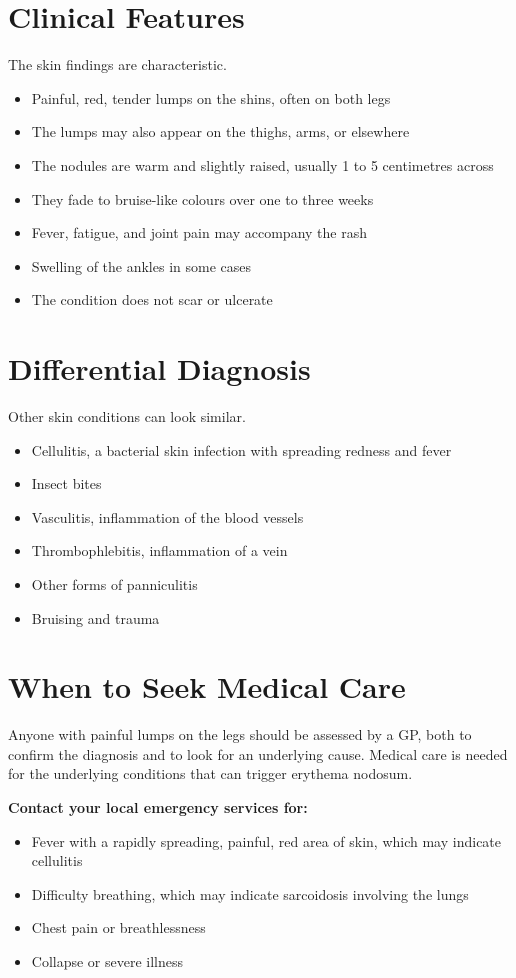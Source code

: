\section*{Clinical Features}
The skin findings are characteristic.
\begin{itemize}
    \item Painful, red, tender lumps on the shins, often on both legs
    \item The lumps may also appear on the thighs, arms, or elsewhere
    \item The nodules are warm and slightly raised, usually 1 to 5 centimetres across
    \item They fade to bruise-like colours over one to three weeks
    \item Fever, fatigue, and joint pain may accompany the rash
    \item Swelling of the ankles in some cases
    \item The condition does not scar or ulcerate
\end{itemize}

\section*{Differential Diagnosis}
Other skin conditions can look similar.
\begin{itemize}
    \item Cellulitis, a bacterial skin infection with spreading redness and fever
    \item Insect bites
    \item Vasculitis, inflammation of the blood vessels
    \item Thrombophlebitis, inflammation of a vein
    \item Other forms of panniculitis
    \item Bruising and trauma
\end{itemize}

\section*{When to Seek Medical Care}
Anyone with painful lumps on the legs should be assessed by a GP, both to confirm the diagnosis and to look for an underlying cause. Medical care is needed for the underlying conditions that can trigger erythema nodosum.

\textbf{Contact your local emergency services for:}
\begin{itemize}
    \item Fever with a rapidly spreading, painful, red area of skin, which may indicate cellulitis
    \item Difficulty breathing, which may indicate sarcoidosis involving the lungs
    \item Chest pain or breathlessness
    \item Collapse or severe illness
\end{itemize}


